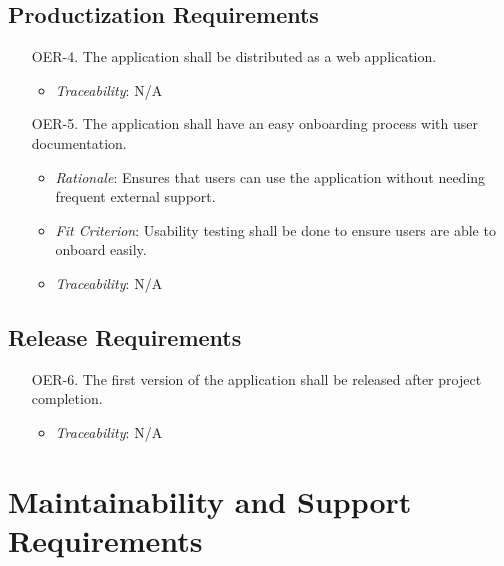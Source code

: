 \documentclass[12pt]{article}
\begin{document}
\subsection{Productization Requirements}
\begin{enumerate}
  \item[OER-4.] The application shall be distributed as a web application.
    \begin{itemize}
      \item \textit{Traceability}: N/A
    \end{itemize}
  \item[OER-5.] The application shall have an easy onboarding process with user documentation.
    \begin{itemize}
      \item \textit{Rationale}: Ensures that users can use the application without needing frequent external support.
      \item \textit{Fit Criterion}: Usability testing shall be done to ensure users are able to onboard easily.
      \item \textit{Traceability}: N/A
    \end{itemize}
\end{enumerate}

\subsection{Release Requirements}
\begin{enumerate}
  \item[OER-6.] The first version of the application shall be released after project completion.
    \begin{itemize}
      \item \textit{Traceability}: N/A
    \end{itemize}
\end{enumerate}

\section{Maintainability and Support Requirements}
\end{document}
